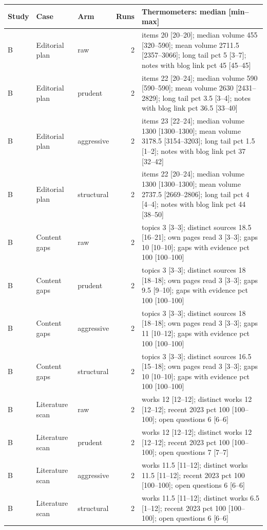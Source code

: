 \begin{longtable}{lllrp{8.0cm}}
\toprule
Study & Case & Arm & Runs & Thermometers: median [min--max] \\
\midrule
\endhead
B & Editorial plan & raw & 2 & items 20 [20--20]; median volume 455 [320--590]; mean volume 2711.5 [2357--3066]; long tail pct 5 [3--7]; notes with blog link pct 45 [45--45] \\
B & Editorial plan & prudent & 2 & items 22 [20--24]; median volume 590 [590--590]; mean volume 2630 [2431--2829]; long tail pct 3.5 [3--4]; notes with blog link pct 36.5 [33--40] \\
B & Editorial plan & aggressive & 2 & items 23 [22--24]; median volume 1300 [1300--1300]; mean volume 3178.5 [3154--3203]; long tail pct 1.5 [1--2]; notes with blog link pct 37 [32--42] \\
B & Editorial plan & structural & 2 & items 22 [20--24]; median volume 1300 [1300--1300]; mean volume 2737.5 [2669--2806]; long tail pct 4 [4--4]; notes with blog link pct 44 [38--50] \\
B & Content gaps & raw & 2 & topics 3 [3--3]; distinct sources 18.5 [16--21]; own pages read 3 [3--3]; gaps 10 [10--10]; gaps with evidence pct 100 [100--100] \\
B & Content gaps & prudent & 2 & topics 3 [3--3]; distinct sources 18 [18--18]; own pages read 3 [3--3]; gaps 9.5 [9--10]; gaps with evidence pct 100 [100--100] \\
B & Content gaps & aggressive & 2 & topics 3 [3--3]; distinct sources 18 [18--18]; own pages read 3 [3--3]; gaps 11 [10--12]; gaps with evidence pct 100 [100--100] \\
B & Content gaps & structural & 2 & topics 3 [3--3]; distinct sources 16.5 [15--18]; own pages read 3 [3--3]; gaps 10 [10--10]; gaps with evidence pct 100 [100--100] \\
B & Literature scan & raw & 2 & works 12 [12--12]; distinct works 12 [12--12]; recent 2023 pct 100 [100--100]; open questions 6 [6--6] \\
B & Literature scan & prudent & 2 & works 12 [12--12]; distinct works 12 [12--12]; recent 2023 pct 100 [100--100]; open questions 7 [7--7] \\
B & Literature scan & aggressive & 2 & works 11.5 [11--12]; distinct works 11.5 [11--12]; recent 2023 pct 100 [100--100]; open questions 6 [6--6] \\
B & Literature scan & structural & 2 & works 11.5 [11--12]; distinct works 6.5 [1--12]; recent 2023 pct 100 [100--100]; open questions 6 [6--6] \\

\end{longtable}
